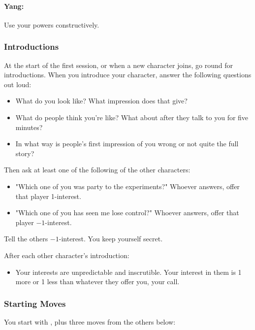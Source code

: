 \paragraph{Yang:} Use your powers constructively.

\subsubsection{Introductions}
At the start of the first session, or when a new character joins, go round for introductions.
When you introduce your character, answer the following questions out loud:
\begin{itemize}
\item What do you look like? What impression does that give?
\item What do people think you're like? What about after they talk to you for five minutes?
\item In what way is people's first impression of you wrong or not quite the full story?
\end{itemize}

Then ask at least one of the following of the other characters:
\begin{itemize}
\item "Which one of you was party to the experiments?" Whoever answers, offer that player 1-interest.
\item "Which one of you has seen me lose control?" Whoever answers, offer that player $-1$-interest.
\end{itemize}
Tell the others $-1$-interest. You keep yourself secret.

After each other character's introduction:
\begin{itemize}
\item Your interests are unpredictable and inscrutible. Your interest in them is 1 more or 1 less than whatever they offer you, your call.
\end{itemize}

\subsubsection{Starting Moves}
You start with , plus three moves from the others below:

